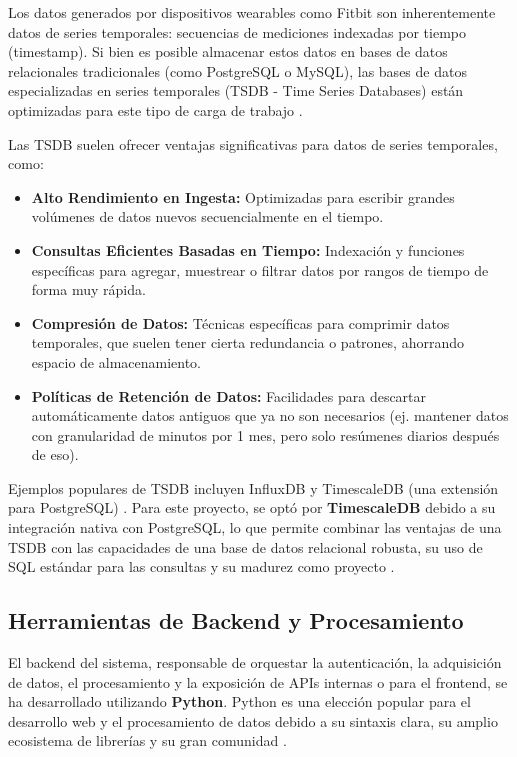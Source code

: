 Los datos generados por dispositivos wearables como Fitbit\textsuperscript{\textregistered} son inherentemente datos de series temporales: secuencias de mediciones indexadas por tiempo (timestamp). Si bien es posible almacenar estos datos en bases de datos relacionales tradicionales (como PostgreSQL o MySQL), las bases de datos especializadas en series temporales (TSDB - Time Series Databases) están optimizadas para este tipo de carga de trabajo \cite{dbengines_timeseries_ranking}.

Las TSDB suelen ofrecer ventajas significativas para datos de series temporales, como:
\begin{itemize}
    \item \textbf{Alto Rendimiento en Ingesta:} Optimizadas para escribir grandes volúmenes de datos nuevos secuencialmente en el tiempo.
    \item \textbf{Consultas Eficientes Basadas en Tiempo:} Indexación y funciones específicas para agregar, muestrear o filtrar datos por rangos de tiempo de forma muy rápida.
    \item \textbf{Compresión de Datos:} Técnicas específicas para comprimir datos temporales, que suelen tener cierta redundancia o patrones, ahorrando espacio de almacenamiento.
    \item \textbf{Políticas de Retención de Datos:} Facilidades para descartar automáticamente datos antiguos que ya no son necesarios (ej. mantener datos con granularidad de minutos por 1 mes, pero solo resúmenes diarios después de eso).
\end{itemize}
Ejemplos populares de TSDB incluyen InfluxDB y TimescaleDB (una extensión para PostgreSQL) \cite{influxdb_docs, timescaledb_docs}. Para este proyecto, se optó por \textbf{TimescaleDB} debido a su integración nativa con PostgreSQL, lo que permite combinar las ventajas de una TSDB con las capacidades de una base de datos relacional robusta, su uso de SQL estándar para las consultas y su madurez como proyecto \cite{timescaledb_docs}.

\subsection{Herramientas de Backend y Procesamiento}
\label{subsec:ea_backend_tools}

El backend del sistema, responsable de orquestar la autenticación, la adquisición de datos, el procesamiento y la exposición de APIs internas o para el frontend, se ha desarrollado utilizando \textbf{Python}. Python es una elección popular para el desarrollo web y el procesamiento de datos debido a su sintaxis clara, su amplio ecosistema de librerías y su gran comunidad \cite{python_website}.

